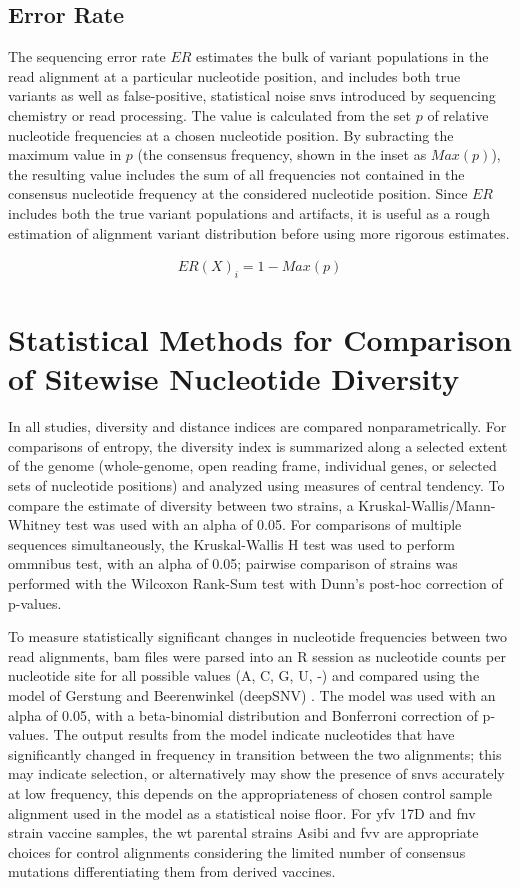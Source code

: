 \subsection{Error Rate}
The sequencing error rate $ER$ estimates the bulk of variant populations in the read alignment at a particular nucleotide position, and includes both true variants as well as false-positive, statistical noise \glspl{snv} introduced by sequencing chemistry or read processing. The value is calculated from the set $p$ of relative nucleotide frequencies at a chosen nucleotide position. By subracting the maximum value in $p$ (the consensus frequency, shown in the inset as $Max(p)$), the resulting value includes the sum of all frequencies not contained in the consensus nucleotide frequency at the considered nucleotide position. Since $ER$ includes both the true variant populations and artifacts, it is useful as a rough estimation of alignment variant distribution before using more rigorous estimates.	

	\begin{align*}
	ER(X)_{ i }=1-Max(p)
	\end{align*}
	
\section{Statistical Methods for Comparison of Sitewise Nucleotide Diversity}
In all studies, diversity and distance indices are compared nonparametrically. For comparisons of entropy, the diversity index is summarized along a selected extent of the genome (whole-genome, open reading frame, individual genes, or selected sets of nucleotide positions) and analyzed using measures of central tendency. To compare the estimate of diversity between two strains, a Kruskal-Wallis/Mann-Whitney test was used with an alpha of 0.05. For comparisons of multiple sequences simultaneously, the Kruskal-Wallis H test was used to perform ommnibus test, with an alpha of 0.05; pairwise comparison of strains was performed with the Wilcoxon Rank-Sum test with Dunn's post-hoc correction of p-values. 

To measure statistically significant changes in nucleotide frequencies between two read alignments, \gls{bam} files were parsed into an R session as nucleotide counts per nucleotide site for all possible values (A, C, G, U, -) and compared using the model of Gerstung and Beerenwinkel (deepSNV) \parencite{Gerstung:2012js}. The model was used with an alpha of 0.05, with a beta-binomial distribution and Bonferroni correction of p-values. The output results from the model indicate nucleotides that have significantly changed in frequency in transition between the two alignments; this may indicate selection, or alternatively may show the presence of \glspl{snv} accurately at low frequency, this depends on the appropriateness of chosen control sample alignment used in the model as a statistical noise floor. For \gls{yfv} 17D and \gls{fnv} strain vaccine samples, the \gls{wt} parental strains Asibi and \gls{fvv} are appropriate choices for control alignments considering the limited number of consensus mutations differentiating them from derived vaccines. 

